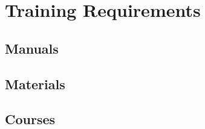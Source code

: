 \KNEADSECTIONNEWPAGE
\section{Training Requirements}
\label{lab:sec_Training}
% 

\KNEADSUBSECTIONNEWPAGE
\subsection{Manuals}
\label{lab:sec_TrainingManuals}




\KNEADSUBSECTIONNEWPAGE
\subsection{Materials}
\label{lab:sec_TrainingMaterials}




\KNEADSUBSECTIONNEWPAGE
\subsection{Courses}
\label{lab:sec_TrainingCourses}

